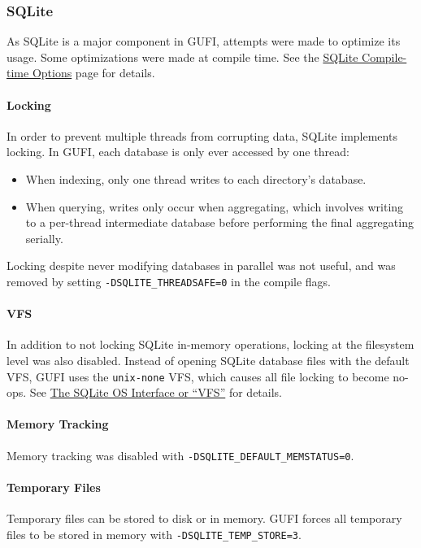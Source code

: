 \subsubsection{SQLite}
As SQLite is a major component in GUFI, attempts were made to optimize
its usage. Some optimizations were made at compile time. See the
\href{https://www.sqlite.org/compile.html}{SQLite Compile-time
  Options} page for details.

\paragraph{Locking}
In order to prevent multiple threads from corrupting data, SQLite
implements locking. In GUFI, each database is only ever accessed by
one thread:

\begin{itemize}
\item When indexing, only one thread writes to each directory's
  database.
\item When querying, writes only occur when aggregating, which
  involves writing to a per-thread intermediate database before
  performing the final aggregating serially.
\end{itemize}

Locking despite never modifying databases in parallel was not useful,
and was removed by setting \texttt{-DSQLITE\_THREADSAFE=0} in the
compile flags.

\paragraph{VFS}
In addition to not locking SQLite in-memory operations, locking at the
filesystem level was also disabled. Instead of opening SQLite database
files with the default VFS, GUFI uses the \texttt{unix-none} VFS,
which causes all file locking to become no-ops. See
\href{https://www.sqlite.org/vfs.html}{The SQLite OS Interface or
  ``VFS''} for details.

\paragraph{Memory Tracking}
Memory tracking was disabled with \texttt{-DSQLITE\_DEFAULT\_MEMSTATUS=0}.

\paragraph{Temporary Files}
Temporary files can be stored to disk or in memory. GUFI forces all
temporary files to be stored in memory with
\texttt{-DSQLITE\_TEMP\_STORE=3}.

